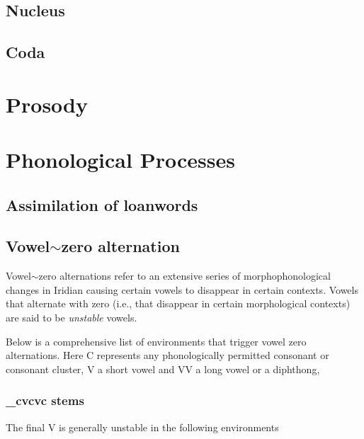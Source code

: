 \subsection{Nucleus}

\subsection{Coda}

\section{Prosody}

\section{Phonological Processes}

\subsection{Assimilation of loanwords}

\subsection{Vowel$\sim$zero alternation}

Vowel$\sim$zero alternations refer to an extensive series of morphophonological changes in Iridian causing certain vowels to disappear in certain contexts. Vowels that alternate with zero (i.e., that disappear in certain morphological contexts) are said to be \textit{unstable} vowels.

\par Below is a comprehensive list of environments that trigger vowel zero alternations. Here C represents any phonologically permitted consonant or consonant cluster, V a short vowel and VV a long vowel or a diphthong,

\subsubsection{\_cvcvc stems}
The final V is generally unstable in the following environments

